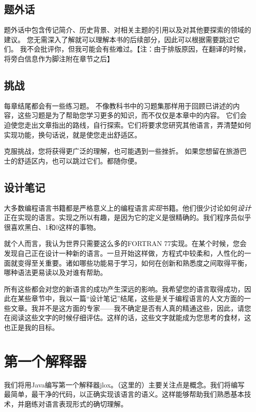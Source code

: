 \documentclass[cn,11pt,chinese]{elegantbook}
\begin{document}
\subsection{题外话}

题外话中包含传记简介、历史背景、对相关主题的引用以及对其他要探索的领域的建议。 您无需深入了解就可以理解本书的后续部分，因此可以根据需要跳过它们。 我不会批评你，但我可能会有些难过。【注：由于排版原因，在翻译的时候，将旁白信息作为脚注附在章节之后】

\subsection{挑战}

每章结尾都会有一些练习题。 不像教科书中的习题集那样用于回顾已讲述的内容，这些习题是为了帮助您学习更多的知识，而不仅仅是本章中的内容。 它们会迫使您走出文章指出的路线，自行探索。它们将要求您研究其他语言，弄清楚如何实现功能，换句话说，就是使您走出舒适区。

克服挑战，您将获得更广泛的理解，也可能遇到一些挫折。 如果您想留在旅游巴士的舒适区内，也可以跳过它们。都随你便。

\subsection{设计笔记}

大多数编程语言书籍都是严格意义上的编程语言\textit{实现}书籍。他们很少讨论如何\textit{设计}正在实现的语言。实现之所以有趣，是因为它的定义是很精确的。我们程序员似乎很喜欢黑白、1和0这样的事物。

就个人而言，我认为世界只需要这么多的FORTRAN 77实现。在某个时候，您会发现自己正在设计一种新的语言。一旦开始这样做，方程式中较柔和，人性化的一面就变得至关重要。诸如哪些功能易于学习，如何在创新和熟悉度之间取得平衡，哪种语法更易读以及对谁有帮助。

所有这些都会对您的新语言的成功产生深远的影响。我希望您的语言取得成功，因此在某些章节中，我以一篇“设计笔记”结尾，这些是关于编程语言的人文方面的一些文章。我并不是这方面的专家——我不确定是否有人真的精通这些，因此，请您在阅读这些文字的时候仔细评估。这样的话，这些文字就能成为您思考的食材，这也正是我的目标。

\section{第一个解释器}

我们将用Java编写第一个解释器jlox。（这里的）主要关注点是概念。我们将编写最简单，最干净的代码，以正确实现该语言的语义。这样能够帮助我们熟悉基本技术，并磨练对语言表现形式的确切理解。
\end{document}
